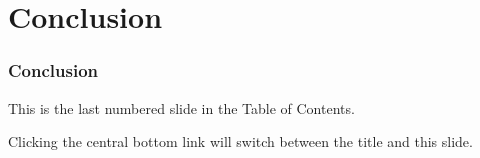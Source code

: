 \section{Conclusion}
\begin{frame}
	\frametitle{Conclusion}
		
	This is the last numbered slide in the Table of Contents. \newline
	
	Clicking the central bottom link will switch between the title and this slide.
\end{frame}